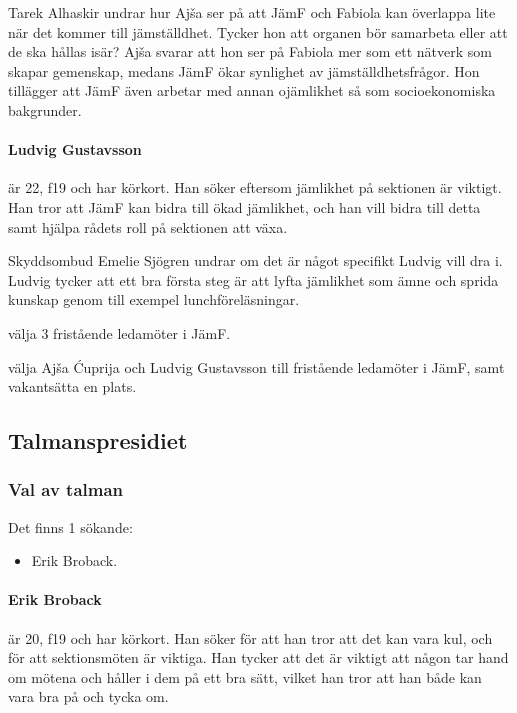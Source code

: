 \documentclass[hidelinks]{sektionsmote}
\begin{document}
Tarek Alhaskir undrar hur Ajša ser på att JämF och Fabiola kan överlappa lite när det kommer till jämställdhet.
Tycker hon att organen bör samarbeta eller att de ska hållas isär?
Ajša svarar att hon ser på Fabiola mer som ett nätverk som skapar gemenskap, medans JämF ökar synlighet av jämställdhetsfrågor.
Hon tillägger att JämF även arbetar med annan ojämlikhet så som socioekonomiska bakgrunder.

\paragraph{Ludvig Gustavsson} är 22, f19 och har körkort.
Han söker eftersom jämlikhet på sektionen är viktigt.
Han tror att JämF kan bidra till ökad jämlikhet, och han vill bidra till detta samt hjälpa rådets roll på sektionen att växa.

Skyddsombud Emelie Sjögren undrar om det är något specifikt Ludvig vill dra i.
Ludvig tycker att ett bra första steg är att lyfta jämlikhet som ämne och sprida kunskap genom till exempel lunchföreläsningar.

\begin{beslut}
  \item välja 3 fristående ledamöter i JämF.
  \item välja Ajša Ćuprija och Ludvig Gustavsson till fristående ledamöter i JämF, samt vakantsätta en plats.
\end{beslut}

\subsection{Talmanspresidiet}

\subsubsection{Val av talman}
Det finns 1 sökande:
\begin{itemize}
    \item Erik Broback.
\end{itemize}

\paragraph{Erik Broback} är 20, f19 och har körkort.
Han söker för att han tror att det kan vara kul, och för att sektionsmöten är viktiga.
Han tycker att det är viktigt att någon tar hand om mötena och håller i dem på ett bra sätt, vilket han tror att han både kan vara bra på och tycka om.
\end{document}
